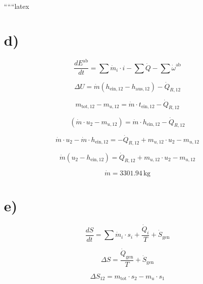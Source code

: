 ``````latex


\section*{d)}

\begin{equation*}
\frac{dE^{\text{ab}}}{dt} = \sum \dot{m}_i \cdot i - \sum \dot{Q} - \sum \dot{\omega}^{\text{ab}}
\end{equation*}

\begin{equation*}
\Delta U = \dot{m} (h_{\text{ein},12} - h_{\text{aus},12}) - \dot{Q}_{R,12}
\end{equation*}

\begin{equation*}
m_{\text{tot},12} - m_{u,12} = \dot{m} \cdot t_{\text{ein},12} - \dot{Q}_{R,12}
\end{equation*}

\begin{equation*}
(\dot{m} \cdot u_2 - m_{u,12}) = \dot{m} \cdot h_{\text{ein},12} - \dot{Q}_{R,12}
\end{equation*}

\begin{equation*}
\dot{m} \cdot u_2 - \dot{m} \cdot h_{\text{ein},12} = - \dot{Q}_{R,12} + m_{u,12} \cdot u_2 - m_{u,12}
\end{equation*}

\begin{equation*}
\dot{m} (u_2 - h_{\text{ein},12}) = \dot{Q}_{R,12} + m_{u,12} \cdot u_2 - m_{u,12}
\end{equation*}

\begin{equation*}
\boxed{\dot{m} = 3301.94 \, \text{kg}}
\end{equation*}

\section*{e)}

\begin{equation*}
\frac{dS}{dt} = \sum \dot{m}_i \cdot s_i + \frac{\dot{Q}_i}{T} + \dot{S}_{\text{gen}}
\end{equation*}

\begin{equation*}
\Delta S = \frac{\dot{Q}_{\text{gen}}}{T} + \dot{S}_{\text{gen}}
\end{equation*}

\begin{equation*}
\Delta S_{12} = m_{\text{tot}} \cdot s_2 - m_u \cdot s_1
\end{equation*}

